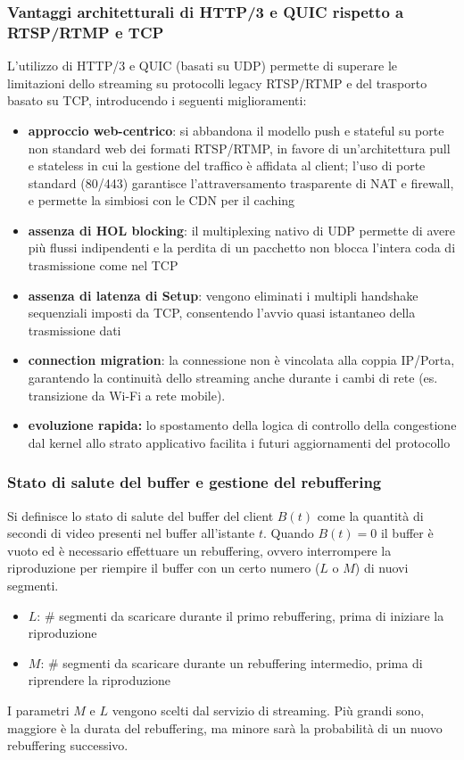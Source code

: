 \subsubsection*{Vantaggi architetturali di HTTP/3 e QUIC rispetto a RTSP/RTMP e TCP}
L'utilizzo di HTTP/3 e QUIC (basati su UDP) permette di superare le limitazioni dello streaming su protocolli legacy RTSP/RTMP
e del trasporto basato su TCP, introducendo i seguenti miglioramenti:
\begin{itemize}
	\item \textbf{approccio web-centrico}: si abbandona il modello push e stateful su porte non standard web dei formati
	RTSP/RTMP, in favore di un'architettura pull e stateless in cui la gestione del traffico è affidata al client; l'uso
	di porte standard (80/443) garantisce l'attraversamento trasparente di NAT e firewall, e permette la simbiosi con le
	CDN per il caching
	\item \textbf{assenza di HOL blocking}: il multiplexing nativo di UDP permette di avere più flussi indipendenti e la
	perdita di un pacchetto non blocca l'intera coda di trasmissione come nel TCP
	\item \textbf{assenza di latenza di Setup}: vengono eliminati i multipli handshake sequenziali imposti da TCP,
	consentendo l'avvio quasi istantaneo della trasmissione dati
	\item \textbf{connection migration}: la connessione non è vincolata alla coppia IP/Porta, garantendo la continuità
	dello streaming anche durante i cambi di rete (es. transizione da Wi-Fi a rete mobile).
	\item \textbf{evoluzione rapida:} lo spostamento della logica di controllo della congestione dal kernel allo strato
	applicativo facilita i futuri aggiornamenti del protocollo
\end{itemize}

\subsubsection*{Stato di salute del buffer e gestione del rebuffering}
Si definisce lo stato di salute del buffer del client \(B(t)\) come la quantità di secondi di video presenti nel buffer
all'istante \(t\). Quando \(B(t) = 0\) il buffer è vuoto ed è necessario effettuare un rebuffering, ovvero interrompere
la riproduzione per riempire il buffer con un certo numero (\(L\) o \(M\)) di nuovi segmenti.
\begin{itemize}
	\item \(L\): \# segmenti da scaricare durante il primo rebuffering, prima di iniziare la riproduzione
	\item \(M\): \# segmenti da scaricare durante un rebuffering intermedio, prima di riprendere la riproduzione
\end{itemize}
I parametri \(M\) e \(L\) vengono scelti dal servizio di streaming. Più grandi sono, maggiore è la durata del rebuffering,
ma minore sarà la probabilità di un nuovo rebuffering successivo.

